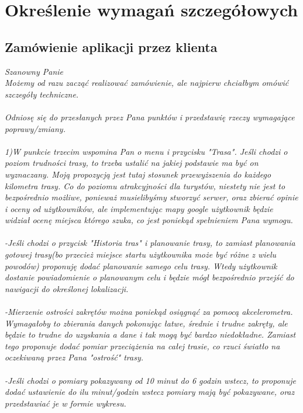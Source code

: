 	\newpage
\section{Określenie wymagań szczegółowych}		%
\subsection{Zamówienie aplikacji przez klienta}  %

\hspace{1cm}
\textit{
Szanowny Panie\\
Możemy od razu zacząć realizować zamówienie, ale najpierw chciałbym omówić szczegóły techniczne. \\\\
Odniosę się do przesłanych przez Pana punktów i przedstawię rzeczy wymagające poprawy/zmiany.\\\\
1)W punkcie trzecim wspomina Pan o menu i przycisku "Trasa". Jeśli chodzi o poziom trudności trasy, to trzeba ustalić na jakiej podstawie ma być on wyznaczany. Moją propozycją jest tutaj stosunek przewyższenia do każdego kilometra trasy. Co do poziomu atrakcyjności dla turystów, niestety nie jest to bezpośrednio możliwe, ponieważ musielibyśmy stworzyć serwer, oraz zbierać opinie i oceny od użytkowników, ale implementując mapy google użytkownik będzie widział ocenę miejsca którego szuka, co jest poniekąd spełnieniem Pana wymogu.\\\\
-Jeśli chodzi o przycisk "Historia tras" i planowanie trasy, to zamiast planowania gotowej trasy(bo przecież miejsce startu użytkownika może być różne z wielu powodów) proponuję dodać planowanie samego celu trasy. Wtedy użytkownik dostanie powiadomienie o planowanym celu i będzie mógł bezpośrednio przejść do nawigacji do określonej lokalizacji.\\\\
-Mierzenie ostrości zakrętów można poniekąd osiągnąć za pomocą akcelerometra. Wymagałoby to zbierania danych pokonując łatwe, średnie i trudne zakręty, ale będzie to trudne do uzyskania a dane i tak mogą być bardzo niedokładne. Zamiast tego proponuje dodać pomiar przeciążenia na całej trasie, co rzuci światło na oczekiwaną przez Pana "ostrość" trasy.\\\\
-Jeśli chodzi o pomiary pokazywany od 10 minut do 6 godzin wstecz, to proponuje dodać ustawienie do ilu minut/godzin wstecz pomiary mają być pokazywane, oraz przedstawiać je w formie wykresu.\\\\
}
